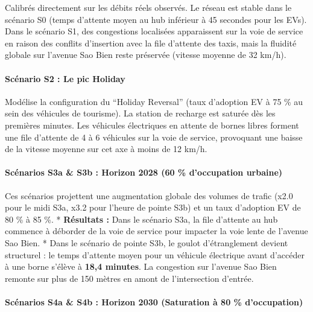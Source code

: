 \documentclass[10pt, a4paper]{article}
\begin{document}
Calibrés directement sur les débits réels observés. Le réseau est stable
dans le scénario S0 (temps d'attente moyen au hub inférieur à 45
secondes pour les EVs). Dans le scénario S1, des congestions localisées
apparaissent sur la voie de service en raison des conflits d'insertion
avec la file d'attente des taxis, mais la fluidité globale sur l'avenue
Sao Bien reste préservée (vitesse moyenne de 32 km/h).

\paragraph{Scénario S2 : Le pic
Holiday}\label{scuxe9nario-s2-le-pic-holiday}

Modélise la configuration du ``Holiday Reversal'' (taux d'adoption EV à
75 \% au sein des véhicules de tourisme). La station de recharge est
saturée dès les premières minutes. Les véhicules électriques en attente
de bornes libres forment une file d'attente de 4 à 6 véhicules sur la
voie de service, provoquant une baisse de la vitesse moyenne sur cet axe
à moins de 12 km/h.

\paragraph{Scénarios S3a \& S3b : Horizon 2028 (60 \% d'occupation
urbaine)}\label{scuxe9narios-s3a-s3b-horizon-2028-60-doccupation-urbaine}

Ces scénarios projettent une augmentation globale des volumes de trafic
(x2.0 pour le midi S3a, x3.2 pour l'heure de pointe S3b) et un taux
d'adoption EV de 80 \% à 85 \%. * \textbf{Résultats :} Dans le scénario
S3a, la file d'attente au hub commence à déborder de la voie de service
pour impacter la voie lente de l'avenue Sao Bien. * Dans le scénario de
pointe S3b, le goulot d'étranglement devient structurel : le temps
d'attente moyen pour un véhicule électrique avant d'accéder à une borne
s'élève à \textbf{18,4 minutes}. La congestion sur l'avenue Sao Bien
remonte sur plus de 150 mètres en amont de l'intersection d'entrée.

\paragraph{Scénarios S4a \& S4b : Horizon 2030 (Saturation à 80 \%
d'occupation)}\label{scuxe9narios-s4a-s4b-horizon-2030-saturation-uxe0-80-doccupation}
\end{document}
